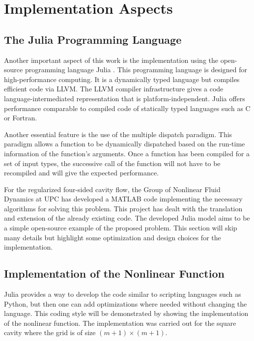 
\section{Implementation Aspects} \label{sec:impl}

\subsection{The Julia Programming Language}

Another important aspect of this work is the implementation using the
open-source programming language Julia \citep{bezanson2017}. This programming
language is designed for high-performance computing. It is a dynamically typed
language but compiles efficient code via LLVM. The LLVM compiler infrastructure
gives a code language-intermediated representation that is
platform-independent. Julia offers performance comparable to compiled code of
statically typed languages such as C or Fortran.

Another essential feature is the use of the multiple dispatch paradigm. This
paradigm allows a function to be dynamically dispatched based on the run-time
information of the function's arguments. Once a function has been compiled for
a set of input types, the successive call of the function will not have to be
recompiled and will give the expected performance. 

For the regularized four-sided cavity flow, the Group of Nonlinear Fluid
Dynamics at UPC has developed a MATLAB code implementing the necessary
algorithms for solving this problem. This project has dealt with the
translation and extension of the already existing code. The developed Julia
model aims to be a simple open-source example of the proposed problem. This
section will skip many details but highlight some optimization and design
choices for the implementation.

\subsection{Implementation of the Nonlinear Function}

Julia provides a way to develop the code similar to scripting languages such as
Python, but then one can add optimizations where needed without changing the
language. This coding style will be demonstrated by showing the implementation
of the nonlinear function. The implementation was carried out for the square
cavity where the grid is of size $(m+1)\times(m+1)$.

